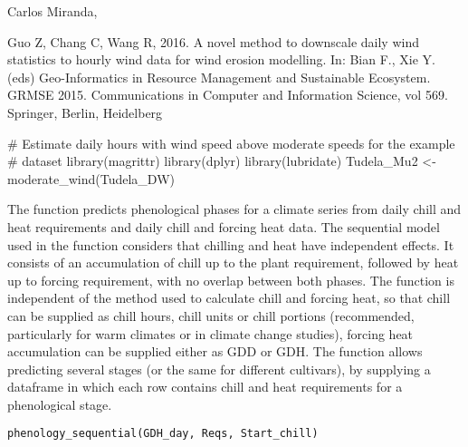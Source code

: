 \documentclass[a4paper]{book}
\begin{document}
%
\begin{Author}\relax
Carlos Miranda, 
\end{Author}
%
\begin{References}\relax
Guo Z, Chang C, Wang R, 2016. A novel method to downscale daily wind
statistics to hourly wind data for wind erosion modelling. In: Bian F.,
Xie Y. (eds) Geo-Informatics in Resource Management and Sustainable
Ecosystem. GRMSE 2015. Communications in Computer and Information Science,
vol 569. Springer, Berlin, Heidelberg
\end{References}
%
\begin{Examples}
\begin{ExampleCode}

# Estimate daily hours with wind speed above moderate speeds for the example
# dataset
library(magrittr)
library(dplyr)
library(lubridate)
Tudela_Mu2 <- moderate_wind(Tudela_DW)

\end{ExampleCode}
\end{Examples}
%
\begin{Description}\relax
The function predicts phenological phases for a climate series
from daily chill and heat requirements and daily chill and forcing heat 
data. The sequential model used in the function considers that chilling 
and heat have independent effects. It consists of an accumulation of chill 
up to the plant requirement, followed by heat up to forcing requirement, 
with no overlap between both phases. The function is independent of the
method used to calculate chill and forcing heat, so that chill can
be supplied as chill hours, chill units or chill portions (recommended, 
particularly for warm climates or in climate change studies), forcing heat 
accumulation can be supplied either as GDD or GDH. The function allows
predicting several stages (or the same for different cultivars), by supplying
a dataframe in which each row contains chill and heat requirements for a
phenological stage.
\end{Description}
%
\begin{Usage}
\begin{verbatim}
phenology_sequential(GDH_day, Reqs, Start_chill)
\end{verbatim}
\end{Usage}
%
\end{document}
